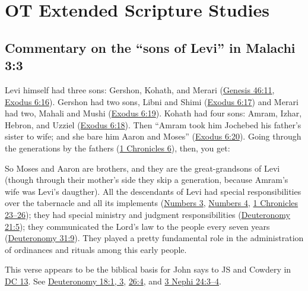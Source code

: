 \section{OT Extended Scripture Studies}
	\label{EXSS-OT}
	
	\subsection{Commentary on the ``sons of Levi'' in Malachi 3:3}
		\label{EXSS-OT-MALACHI-3-3-SONS}
		
		Levi himself had three sons: Gershon, Kohath, and Merari (\hyperref[GENESIS-46-11]{Genesis 46:11}, \hyperref[EXODUS-6-16]{Exodus 6:16}). Gershon had two sons, Libni and Shimi (\hyperref[EXODUS-6-17]{Exodus 6:17}) and Merari had two, Mahali and Mushi (\hyperref[EXODUS-6-19]{Exodus 6:19}). Kohath had four sons: Amram, Izhar, Hebron, and Uzziel (\hyperref[EXODUS-6-18]{Exodus 6:18}). Then ``Amram took him Jochebed his father's sister to wife; and she bare him Aaron and Moses'' (\hyperref[EXODUS-6-20]{Exodus 6:20}). Going through the generations by the fathers (\hyperref[1CHRONICLES-6]{1 Chronicles 6}), then, you get: 
					
					
		So Moses and Aaron are brothers, and they are the great-grandsons of Levi (though through their mother's side they skip a generation, because Amram's wife was Levi's daugther). All the descendants of Levi had special responsibilities over the tabernacle and all its implements (\hyperref[NUMBERS-3]{Numbers 3}, \hyperref[NUMBERS-4]{Numbers 4}, \hyperref[1CHRONICLES-23]{1 Chronicles 23--26}); they had special ministry and judgment responsibilities (\hyperref[DEUTERONOMY-21-5]{Deuteronomy 21:5}); they communicated the Lord's law to the people every seven years (\hyperref[DEUTERONOMY-31-9]{Deuteronomy 31:9}). They played a pretty fundamental role in the administration of ordinances and rituals among this early people.
		
		This verse appears to be the biblical basis for John says to JS and Cowdery in \hyperref[DC13]{DC 13}. See \hyperref[DEUTERONOMY-18-1]{Deuteronomy 18:1, 3}, \hyperref[DEUTERONOMY-26-4]{26:4}, and \hyperref[3NEPHI-24-3]{3 Nephi 24:3--4}.
		
